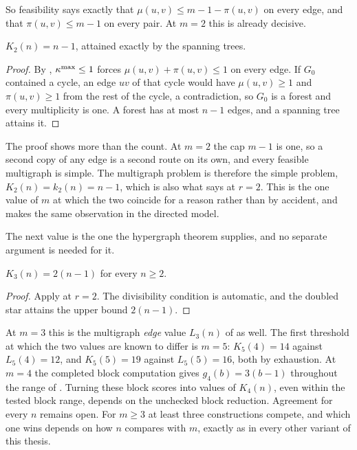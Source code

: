 So feasibility says exactly that $\mu(u,v) \le m-1-\pi(u,v)$ on every edge, and that $\pi(u,v) \le m-1$ on every pair. At $m = 2$ this is already decisive.

\begin{theorem}[The multigraph incidence value at $m = 2$]\label{thm:multi-vertex-m2}
$K_2(n) = n-1$, attained exactly by the spanning trees.
\end{theorem}

\begin{proof}
By , $\kappa^{\max} \le 1$ forces $\mu(u,v) + \pi(u,v) \le 1$ on every edge. If $G_0$ contained a cycle, an edge $uv$ of that cycle would have $\mu(u,v) \ge 1$ and $\pi(u,v) \ge 1$ from the rest of the cycle, a contradiction, so $G_0$ is a forest and every multiplicity is one. A forest has at most $n-1$ edges, and a spanning tree attains it.
\end{proof}

\begin{remark}[Why $m = 2$ is not a multigraph question at all]\label{rem:multi-vertex-m2-simple}
The proof shows more than the count. At $m = 2$ the cap $m-1$ is one, so a second copy of any edge is a second route on its own, and every feasible multigraph is simple. The multigraph problem is therefore the simple problem, $K_2(n) = k_2(n) = n-1$, which is also what  says at $r = 2$. This is the one value of $m$ at which the two coincide for a reason rather than by accident, and  makes the same observation in the directed model.
\end{remark}

The next value is the one the hypergraph theorem supplies, and no separate argument is needed for it.

\begin{corollary}[The multigraph incidence value at $m = 3$]\label{cor:multi-vertex-m3}
$K_3(n) = 2(n-1)$ for every $n \ge 2$.
\end{corollary}

\begin{proof}
Apply  at $r=2$.
The divisibility condition is automatic, and the doubled star attains the
upper bound $2(n-1)$.
\end{proof}

At $m = 3$ this is the multigraph \emph{edge} value $L_3(n)$ of  as well. The first threshold at which the two values are known to differ is $m = 5$: $K_5(4) = 14$ against $L_5(4) = 12$, and $K_5(5) = 19$ against $L_5(5) = 16$, both by exhaustion. At $m = 4$ the completed block computation gives $g_4(b) = 3(b-1)$ throughout the range of . Turning these block scores into values of $K_4(n)$, even within the tested block range, depends on the unchecked block reduction. Agreement for every $n$ remains open. For $m \ge 3$ at least three constructions compete, and which one wins depends on how $n$ compares with $m$, exactly as in every other variant of this thesis.

